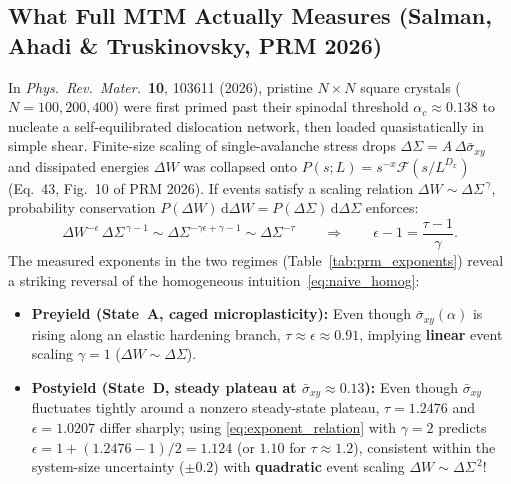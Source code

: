 \documentclass[11pt,a4paper]{article}
\newcommand{\dS}{\Delta\Sigma}
\newcommand{\dW}{\Delta W}
\newcommand{\dsigbar}{\Delta\bar{\sigma}_{xy}}
\newcommand{\sigbar}{\bar{\sigma}_{xy}}
\begin{document}
\subsection{What Full MTM Actually Measures (Salman, Ahadi \& Truskinovsky, PRM 2026)}

In \emph{Phys.\ Rev.\ Mater.}\ \textbf{10}, 103611 (2026), pristine $N\times N$ square crystals ($N=100,200,400$) were first primed past their spinodal threshold $\alpha_c \approx 0.138$ to nucleate a self-equilibrated dislocation network, then loaded quasistatically in simple shear. Finite-size scaling of single-avalanche stress drops $\dS = A\,\dsigbar$ and dissipated energies $\dW$ was collapsed onto $P(s;L) = s^{-x}\mathcal{F}(s/L^{D_x})$ (Eq.~43, Fig.~10 of PRM 2026). If events satisfy a scaling relation $\dW \sim \dS^{\,\gamma}$, probability conservation $P(\dW)\,\mathrm{d}\dW = P(\dS)\,\mathrm{d}\dS$ enforces:
\begin{equation}
\label{eq:exponent_relation}
\dW^{-\epsilon}\,\dS^{\,\gamma-1} \sim \dS^{-\gamma\epsilon + \gamma - 1} \sim \dS^{-\tau}
\qquad\Longrightarrow\qquad
\epsilon - 1 = \frac{\tau - 1}{\gamma}.
\end{equation}
The measured exponents in the two regimes (Table~\ref{tab:prm_exponents}) reveal a striking reversal of the homogeneous intuition~\eqref{eq:naive_homog}:
\begin{itemize}[nosep]
  \item \textbf{Preyield (State~A, caged microplasticity):} Even though $\sigbar(\alpha)$ is rising along an elastic hardening branch, $\tau \approx \epsilon \approx 0.91$, implying \textbf{linear} event scaling $\gamma = 1$ ($\dW \sim \dS$).
  \item \textbf{Postyield (State~D, steady plateau at $\sigbar \approx 0.13$):} Even though $\sigbar$ fluctuates tightly around a nonzero steady-state plateau, $\tau = 1.2476$ and $\epsilon = 1.0207$ differ sharply; using \eqref{eq:exponent_relation} with $\gamma = 2$ predicts $\epsilon = 1 + (1.2476-1)/2 = 1.124$ (or $1.10$ for $\tau\approx 1.2$), consistent within the system-size uncertainty ($\pm 0.2$) with \textbf{quadratic} event scaling $\dW \sim \dS^{\,2}$!
\end{itemize}
\end{document}
